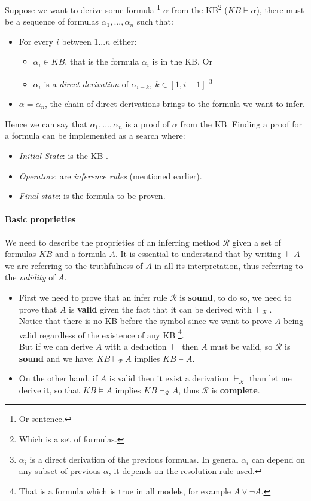 \documentclass[10pt,a4paper]{article}
\begin{document}
Suppose we want to derive some formula \footnote{Or sentence.} $\alpha$ from the KB\footnote{Which is a set of formulas.} ($KB \vdash \alpha$), there must be a sequence of formulas $\alpha_1,...,\alpha_n$ such that:
\begin{itemize}
\item For every $i$ between $1...n$ either:
	\begin{itemize}
	\item $\alpha_i\in KB$, that is the formula $\alpha_i$ is in the KB. Or
	\item  $\alpha_i$ is a \textit{direct derivation} of $\alpha_{i-k},\ k\in [1,i-1]$ \footnote{$\alpha_i$  is a direct derivation of the previous formulas. In general $\alpha_i$ can depend on any subset of previous $\alpha$, it depends on the resolution rule used. }
	\end{itemize}
\item $\alpha=\alpha_n$, the chain of direct derivations brings to the formula we want to infer.
\end{itemize} 
Hence we can say that $\alpha_1,...,\alpha_n$ is a proof of $\alpha$ from the KB.
Finding a proof for a formula can be implemented as a search where:
\begin{itemize}
\item \textit{Initial State}: is the KB  .
\item \textit{Operators}: are \textit{inference rules} (mentioned earlier).
\item \textit{Final state}: is the formula to be proven.

\end{itemize}



\paragraph{Basic proprieties}
We need to describe the proprieties of an inferring method $\mathcal{R}$ given a set of formulas $KB$ and a formula $A$. It is essential to understand that by writing $\models A$ we are referring to the truthfulness of $A$ in all its interpretation, thus referring to the \textit{validity} of $A$.
\begin{itemize}
\item First we need to prove that an infer rule $\mathcal{R}$ is \textbf{sound}, to do so, we need to prove that $A$ is \textbf{valid} given the fact that it can be derived with $\vdash_{\mathcal{R}}$.\\ 
Notice that there is no KB before the symbol since we want to prove $A$ being valid  regardless of the existence of any KB \footnote{That is a formula which is true in all models, for example $A \vee \neg A$.}.\\
But if we can derive $A$ with a deduction $\vdash$ then $A$ must be valid, so $\mathcal{R}$ is \textbf{sound} and we have: $KB \vdash_{\mathcal{R}} A$ implies $KB \models A$.
\item On the other hand, if $A$ is valid then it exist a derivation $\vdash_{\mathcal{R}} $ than let me derive it, so that $KB \models A$ implies $KB \vdash_{\mathcal{R}} A$, thus  $\mathcal{R}$ is \textbf{complete}.
\end{itemize}
\end{document}
